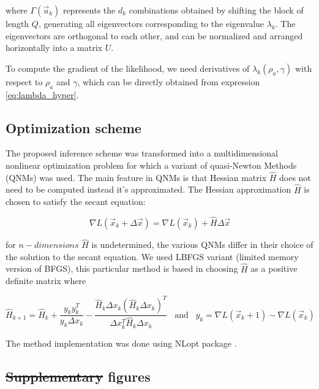 \documentclass[preprint,amsmath,amssymb,superscriptaddress,showpacs,pre]{revtex4-1}
\providecommand{\DIFadd}[1]{{\protect\color{blue}\uwave{#1}}} %
\providecommand{\DIFdel}[1]{{\protect\color{red}\sout{#1}}}                      %
\providecommand{\DIFaddbegin}{} %
\providecommand{\DIFaddend}{} %
\providecommand{\DIFdelbegin}{} %
\providecommand{\DIFdelend}{} %
\newcommand{\DIFscaledelfig}{0.5}
\newlength{\DIFdelgraphicswidth} %
\newlength{\DIFdelgraphicsheight} %
\newcommand{\DIFaddincludegraphics}[2][]{{\color{blue}\fbox{\DIFOincludegraphics[#1]{#2}}}} %
\newcommand{\DIFdelincludegraphics}[2][]{%
\sbox{\DIFdelgraphicsbox}{\DIFOincludegraphics[#1]{#2}}%
\settoboxwidth{\DIFdelgraphicswidth}{\DIFdelgraphicsbox} %
\settoboxtotalheight{\DIFdelgraphicsheight}{\DIFdelgraphicsbox} %
\scalebox{\DIFscaledelfig}{%
\parbox[b]{\DIFdelgraphicswidth}{\usebox{\DIFdelgraphicsbox}\\[-\baselineskip] \rule{\DIFdelgraphicswidth}{0em}}\llap{\resizebox{\DIFdelgraphicswidth}{\DIFdelgraphicsheight}{%
\setlength{\unitlength}{\DIFdelgraphicswidth}%
\begin{picture}(1,1)%
\thicklines\linethickness{2pt} %
{\color[rgb]{1,0,0}\put(0,0){\framebox(1,1){}}}%
{\color[rgb]{1,0,0}\put(0,0){\line( 1,1){1}}}%
{\color[rgb]{1,0,0}\put(0,1){\line(1,-1){1}}}%
\end{picture}%
}\hspace*{3pt}}} %
} %
\DeclareRobustCommand{\DIFaddbegin}{\DIFOaddbegin \let\includegraphics\DIFaddincludegraphics} %
\DeclareRobustCommand{\DIFaddend}{\DIFOaddend \let\includegraphics\DIFOincludegraphics} %
\DeclareRobustCommand{\DIFdelbegin}{\DIFOdelbegin \let\includegraphics\DIFdelincludegraphics} %
\DeclareRobustCommand{\DIFdelend}{\DIFOaddend \let\includegraphics\DIFOincludegraphics} %
\begin{document}
where $\Gamma(\vec{u}_k )$ represents the $d_k$ combinations obtained by shifting the block of length $Q$, generating all eigenvectors corresponding to the eigenvalue $\lambda_k$.  The eigenvectors are orthogonal to each other, and can be  normalized and arranged horizontally into a matrix $U$. 

To compute the gradient of the likelihood, we need  derivatives of $\lambda_k(\rho_a,\gamma)$ with respect to $\rho_a$ and $\gamma$, which can be directly obtained from expression \eqref{eq:lambda_hyper}.


\subsection{Optimization scheme}
\label{sub:optimization_scheme}

The proposed inference scheme was transformed into a multidimensional nonlinear optimization problem for which a variant  of quasi-Newton Methods (QNMs) was used.  The main feature in QNMs is that Hessian matrix $\hat{H}$  does not need to be computed instead it’s approximated. The Hessian approximation $\hat{H}$ is chosen to satisfy the secant equation:

$$\nabla L(\vec{x}_k+\Delta\vec{x})=\nabla L(\vec{x}_k)+\hat{H} \Delta\vec{x} $$


for $n-dimensions$ $\hat{H}$ is undetermined, the various QNMs differ in their choice of the solution to the secant equation. We used LBFGS variant  (limited memory version of BFGS), this particular method is based in choosing $\hat{H}$ as a positive definite matrix where

$$\hat{H}_{k+1}=\hat{H}_{k}+\frac{y_k y^{T}_k}{y_k\Delta x_k} - \frac{\hat{H}_k\Delta x_k(\hat{H}_k\Delta x_k)^T}{\Delta x^T_k\hat{H}_k\Delta x_k} \;\;\;\text{and}\;\;\; y_k=\nabla L(\vec{x}_k+1)-\nabla L(\vec{x}_k)$$

The method implementation was done using   NLopt package \cite{NLopt} .

\subsection{\DIFdelbegin \DIFdel{Supplementary }\DIFdelend \DIFaddbegin \DIFadd{Supporting }\DIFaddend figures}
\label{sub:supplementary_figures}
\end{document}
